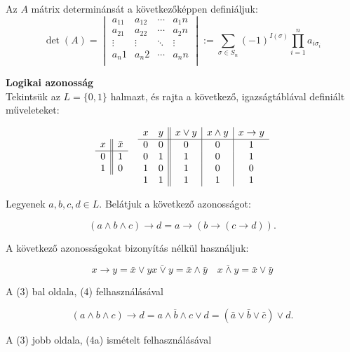 \documentclass{article}
\begin{document}
	Az $A$ mátrix determinánsát a következőképpen definiáljuk:
	\begin{equation}
		\operatorname{det}(A) =  \begin{vmatrix}
			a_11 & a_12 & \cdots & a_1n \\
			a_21 & a_22 & \cdots & a_2n \\
			\vdots & \vdots & \ddots & \vdots \\
			a_n1 & a_n2 & \cdots & a_nn \\
		\end{vmatrix} := \sum_{\sigma \in S_n} (-1)^{I(\sigma)} \prod_{i=1}^n a_{i\sigma_i}
	\end{equation}
	
	\textbf{Logikai azonosság}\\
	
	\noindent Tekintsük az $L = \lbrace0, 1\rbrace$ halmazt, és rajta a következő, igazságtáblával definiált műveleteket:
	
	\[\begin{array}{c || c}
		x & \bar{x} \\ \hline
		0 & 1 \\
		1 & 0 \\
	\end{array}
	\quad
	\begin{array}{c c || c | c | c}
		x & y & x \vee y & x \wedge y & x \rightarrow y \\ \hline
		0 & 0 & 0 & 0 & 1 \\
		0 & 1 & 1 & 0 & 1 \\
		1 & 0 & 1 & 0 & 0 \\
		1 & 1 & 1 & 1 & 1 \\
	\end{array}
	\]
	
	Legyenek $a, b, c, d \in L$. Belátjuk a következő azonosságot:
	
	\begin{equation}
		(a \wedge b \wedge c) \rightarrow d = a \rightarrow ( b \rightarrow( c \rightarrow d))\text{.}
	\end{equation}
	
	A következő azonosságokat bizonyítás nélkül használjuk:
	
	\begin{subequations}
		\begin{equation}
			x \rightarrow y = \bar{x} \vee y
		\end{equation}
		\begin{equation}
			\overline{x \vee y} = \bar{x} \wedge \bar{y}
			\quad
			\overline{x \wedge y} = \bar{x} \vee \bar{y}
		\end{equation}
	\end{subequations}
	
	A (3) bal oldala, (4) felhasználásával
	
	\begin{equation}
		(a \wedge b \wedge c) \rightarrow d = \overline{a \wedge b \wedge c} \vee d = (\bar{a} \vee \bar{b} \vee \bar{c}) \vee d \text{.}
	\end{equation}
	
	A (3) jobb oldala, (4a) ismételt felhasználásával
	
\end{document}

